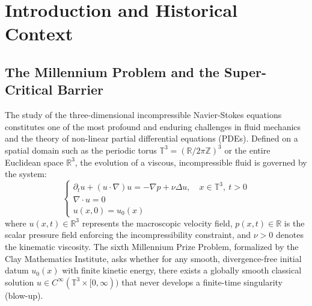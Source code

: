\documentclass[12pt,a4paper]{article}
\theoremstyle{plain}
\theoremstyle{definition}
\theoremstyle{remark}
\begin{document}
\section{Introduction and Historical Context}

\subsection{The Millennium Problem and the Super-Critical Barrier}
The study of the three-dimensional incompressible Navier-Stokes equations constitutes one of the most profound and enduring challenges in fluid mechanics and the theory of non-linear partial differential equations (PDEs). Defined on a spatial domain such as the periodic torus $\mathbb{T}^3 = (\mathbb{R} / 2\pi\mathbb{Z})^3$ or the entire Euclidean space $\mathbb{R}^3$, the evolution of a viscous, incompressible fluid is governed by the system:
\begin{equation}\label{eq:ns_system}
    \begin{cases}
    \partial_t u + (u \cdot \nabla)u = -\nabla p + \nu \Delta u, \quad x \in \mathbb{T}^3, \ t > 0 \\
    \nabla \cdot u = 0 \\
    u(x, 0) = u_0(x)
    \end{cases}
\end{equation}
where $u(x,t) \in \mathbb{R}^3$ represents the macroscopic velocity field, $p(x,t) \in \mathbb{R}$ is the scalar pressure field enforcing the incompressibility constraint, and $\nu > 0$ denotes the kinematic viscosity. The sixth Millennium Prize Problem, formalized by the Clay Mathematics Institute, asks whether for any smooth, divergence-free initial datum $u_0(x)$ with finite kinetic energy, there exists a globally smooth classical solution $u \in C^\infty(\mathbb{T}^3 \times [0, \infty))$ that never develops a finite-time singularity (blow-up).
\end{document}
